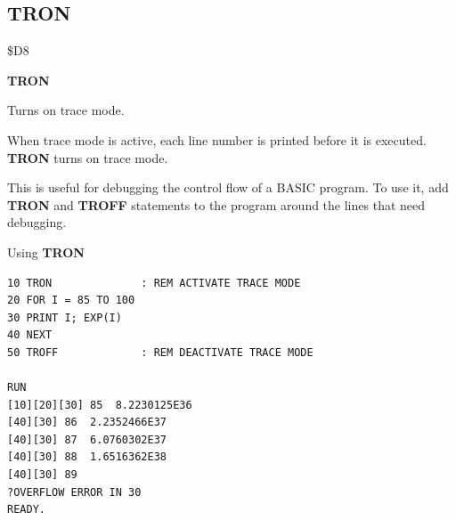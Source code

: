 \subsection{TRON}
\begin{description}[leftmargin=2cm,style=nextline]
\item [Token:]    \$D8

\item [Format:]   {\bf TRON}

\item [Usage:]    Turns on trace mode.

                  When trace mode is active, each line number is printed before it is executed. {\bf TRON} turns on trace mode.

                  This is useful for debugging the control flow of a BASIC program. To use it, add {\bf TRON} and {\bf TROFF} statements to the program around the lines that need debugging.

\item [Example:]  Using {\bf TRON}

\begin{tcolorbox}[colback=black,coltext=white]
\verbatimfont{\codefont}
\begin{verbatim}
10 TRON              : REM ACTIVATE TRACE MODE
20 FOR I = 85 TO 100
30 PRINT I; EXP(I)
40 NEXT
50 TROFF             : REM DEACTIVATE TRACE MODE

RUN
[10][20][30] 85  8.2230125E36
[40][30] 86  2.2352466E37
[40][30] 87  6.0760302E37
[40][30] 88  1.6516362E38
[40][30] 89
?OVERFLOW ERROR IN 30
READY.
\end{verbatim}
\end{tcolorbox}
\end{description}


\newpage
